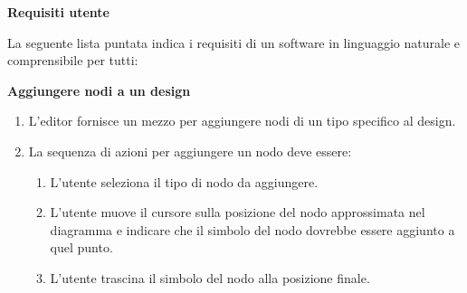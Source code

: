 \begin{esempio}
	\textbf{Requisiti utente}\par
	\noindent La seguente lista puntata indica i requisiti di un software in linguaggio naturale e comprensibile per tutti:\newline
	
	\textbf{Aggiungere nodi a un design} \begin{enumerate}
		\item L'editor fornisce un mezzo per aggiungere nodi di un tipo specifico al design.
		\item La sequenza di azioni per aggiungere un nodo deve essere: \begin{enumerate}
			\item L'utente seleziona il tipo di nodo da aggiungere.
			\item L'utente muove il cursore sulla posizione del nodo approssimata nel diagramma e indicare che il simbolo del nodo dovrebbe essere
			aggiunto a quel punto.
			\item L'utente trascina il simbolo del nodo alla posizione finale.
		\end{enumerate}
	\end{enumerate}
\end{esempio}

